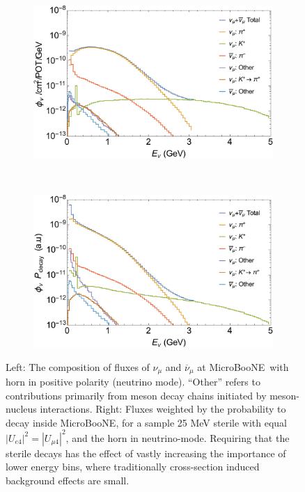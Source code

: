 \documentclass[11pt, a4paper]{article}
\def\muboone{MicroBooNE}
\begin{document}
\begin{figure}[t]
\center
\begin{subfigure}[t]{0.5\textwidth}
\includegraphics[width=\textwidth]{figures/microBooNE_flux.pdf} 
\end{subfigure}%
~
\begin{subfigure}[t]{0.475\textwidth}
\includegraphics[width=\textwidth]{figures/microBooNE_flux_weighted.pdf}
\end{subfigure}

\caption{\label{fig:flux_plots} Left: The composition of fluxes of $\nu_\mu$
and $\overline{\nu}_\mu$ at \muboone\ with horn in positive polarity (neutrino
mode). ``Other'' refers to contributions primarily from meson decay chains
initiated by meson-nucleus interactions. Right: Fluxes weighted by the
probability to decay inside \muboone, for a sample 25 MeV sterile with equal
$|U_{e4}|^2 = |U_{\mu 4}|^2$, and the horn in neutrino-mode. Requiring that the
sterile decays has the effect of vastly increasing the importance of lower
energy bins, where traditionally cross-section induced background effects are
small.}

\end{figure}
\end{document}
